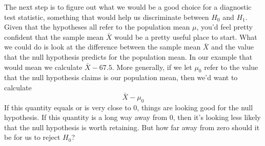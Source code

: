 The next step is to figure out what we would be a good choice for a diagnostic test statistic, something that would help us discriminate between $H_0$ and $H_1$. Given that the hypotheses all refer to the population mean $\mu$, you'd feel pretty confident that the sample mean $\bar{X}$ would be a pretty useful place to start. What we could do is look at the difference between the sample mean $\bar{X}$ and the value that the null hypothesis predicts for the population mean. In our example that would mean we calculate $\bar{X} - 67.5$. More generally, if we let $\mu_0$ refer to the value that the null hypothesis claims is our population mean, then we'd want to calculate
$$
\bar{X} - \mu_0
$$
If this quantity equals or is very close to 0, things are looking good for the null hypothesis. If this quantity is a long way away from 0, then it's looking less likely that the null hypothesis is worth retaining. But how far away from zero should it be for us to reject $H_0$? 

